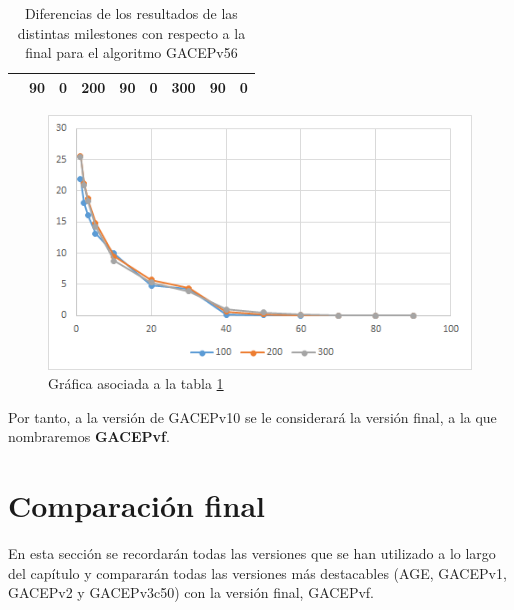 \begin{table}[h]
\begin{tabular}{|cclcclccl|}
\rowcolor[HTML]{DAE8FC} 
\multicolumn{1}{|c|}{\multirow{-13}{*}{\cellcolor[HTML]{FFFFC7}\textbf{100}}} & \multicolumn{1}{c|}{\cellcolor[HTML]{DAE8FC}90}        & \multicolumn{1}{l|}{\cellcolor[HTML]{DAE8FC}0}          & \multicolumn{1}{c|}{\multirow{-13}{*}{\cellcolor[HTML]{FFFFC7}\textbf{200}}} & \multicolumn{1}{c|}{\cellcolor[HTML]{DAE8FC}90}        & \multicolumn{1}{l|}{\cellcolor[HTML]{DAE8FC}0}          & \multicolumn{1}{c|}{\multirow{-13}{*}{\cellcolor[HTML]{FFFFC7}\textbf{300}}} & \multicolumn{1}{c|}{\cellcolor[HTML]{DAE8FC}90}        & 0          \\ \hline
\end{tabular}
\caption{\label{DiferenciasGACEPv56}Diferencias de los resultados de las distintas milestones con respecto a la final para el algoritmo GACEPv56}
\end{table}

\begin{figure}[h]
		\centering
		\includegraphics[scale=1]{imagenes/Experimental/DiferenciasGACEPv56.png}
        \caption{Gráfica asociada a la tabla \ref{DiferenciasGACEPv56}}
        \label{fig:DiferenciasGACEPv56}
\end{figure}


Por tanto, a la versión de GACEPv10 se le considerará la versión final, a la que nombraremos \textbf{GACEPvf}.

\section{Comparación final}

En esta sección se recordarán todas las versiones que se han utilizado a lo largo del capítulo y compararán todas las versiones más destacables (AGE, GACEPv1, GACEPv2 y GACEPv3c50) con la versión final, GACEPvf. 

